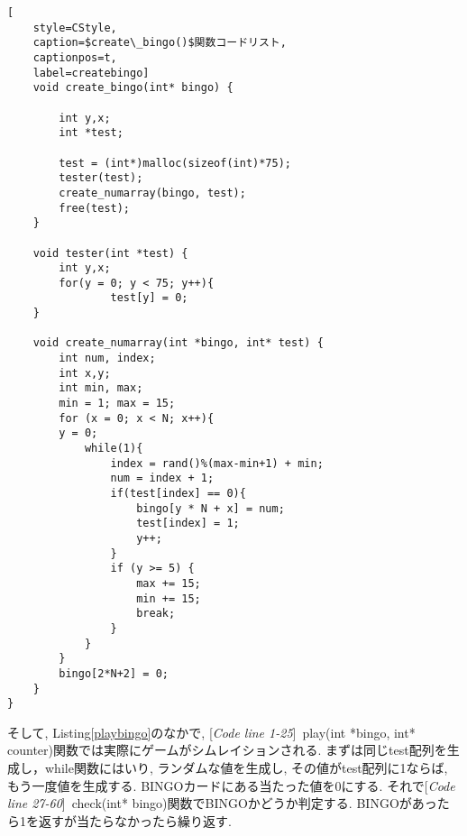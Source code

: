 \documentclass[a4j, titlepage]{jarticle}
\begin{document}
\begin{lstlisting}[
    style=CStyle, 
    caption=$create\_bingo()$関数コードリスト,
    captionpos=t,
    label=createbingo]
    void create_bingo(int* bingo) {

        int y,x;
        int *test;

        test = (int*)malloc(sizeof(int)*75);
        tester(test);
        create_numarray(bingo, test);
        free(test);
    }

    void tester(int *test) {
        int y,x;
        for(y = 0; y < 75; y++){
                test[y] = 0;
    }

    void create_numarray(int *bingo, int* test) {
        int num, index;
        int x,y;
        int min, max;
        min = 1; max = 15;
        for (x = 0; x < N; x++){
        y = 0;
            while(1){
                index = rand()%(max-min+1) + min;
                num = index + 1;
                if(test[index] == 0){
                    bingo[y * N + x] = num;
                    test[index] = 1;
                    y++; 
                }
                if (y >= 5) {
                    max += 15;
                    min += 15;
                    break;
                }
            }
        }
        bingo[2*N+2] = 0;
    }    
}

\end{lstlisting}
\vspace{10pt}
そして, Listing\ref{playbingo}のなかで, [\textit{Code line 1-25}]~play(int *bingo, int* counter)関数では実際にゲームがシムレイションされる. まずは同じtest配列を生成し，while関数にはいり, ランダムな値を生成し, その値がtest配列に1ならば, もう一度値を生成する. BINGOカードにある当たった値を0にする. それで[\textit{Code line 27-60}]~check(int* bingo)関数でBINGOかどうか判定する. BINGOがあったら1を返すが当たらなかったら繰り返す. 
\end{document}
